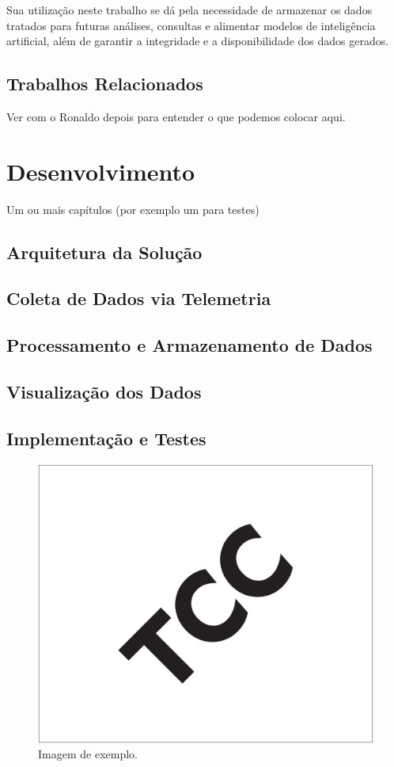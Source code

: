 \documentclass[12pt, %
openright, 
oneside, %
a4paper,    %
brazil]{facom-ufu-abntex2}
\begin{document}
Sua utilização neste trabalho se dá pela necessidade de armazenar os dados tratados para futuras análises, consultas e alimentar modelos de inteligência artificial, 
além de garantir a integridade e a disponibilidade dos dados gerados. 

\section{Trabalhos Relacionados}

Ver com o Ronaldo depois para entender o que podemos colocar aqui.


\chapter{Desenvolvimento}
Um ou mais capítulos (por exemplo um para testes)
\section{Arquitetura da Solução}
\section{Coleta de Dados via Telemetria}
\section{Processamento e Armazenamento de Dados}
\section{Visualização dos Dados}
\section{Implementação e Testes}


\begin{figure}[!ht]
    \centering
	\includegraphics[width=0.55\linewidth]{imagemExemplo.pdf}
	\caption[Isso é o que aparece no sumário]{Imagem de exemplo.}
	\label{fig:graficosVariandoTamanhoRede}
\end{figure}
\end{document}
